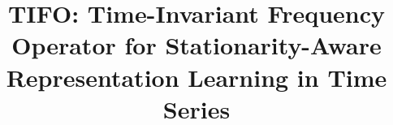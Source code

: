 \documentclass[sigconf,anonymous,review]{acmart}
\begin{document}
\onecolumn

\clearpage
\twocolumn

\title{TIFO: Time-Invariant Frequency Operator for Stationarity-Aware Representation Learning in Time Series}

\author{} %
\affiliation{} %
\email{} %


\end{document}
